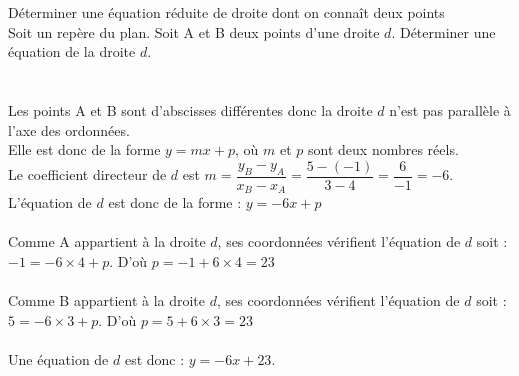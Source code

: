 \documentclass[11pt,a4paper]{article}  %
\begin{document}
\begin{methodeTitre}{Déterminer une équation réduite de droite dont on connaît deux points}
\\
Soit \Rij un repère du plan. Soit A et B deux points d'une droite $d$.
Déterminer une équation de la droite $d$.\\
\ \\
\\
Les points A et B sont d'abscisses différentes donc la droite $d$ n'est pas parallèle à l'axe des ordonnées.\\ Elle est donc de la forme $y = mx + p$, où $m$ et $p$ sont deux nombres réels.\\
Le coefficient directeur de $d$ est $m =  \dfrac{y_B-y_A}{x_B-x_A}=\dfrac{5-(-1)}{3-4}=\dfrac{6}{-1} = -6$.\\
L'équation de $d$ est donc de la forme : $y = -6x + p$\\
\\
Comme A appartient à la droite $d$, ses coordonnées vérifient l'équation de $d$ soit :\\
$-1 = -6 \times 4 + p$. D'où  $p = -1 + 6 \times 4 = 23$\\
\\
Comme B appartient à la droite $d$, ses coordonnées vérifient l'équation de $d$ soit :\\
$5 = -6 \times 3 + p$. D'où  $p = 5 + 6 \times 3 = 23$\\
\ \\
Une équation de $d$ est donc :  $y = - 6x + 23$.
\end{methodeTitre}
\end{document}
